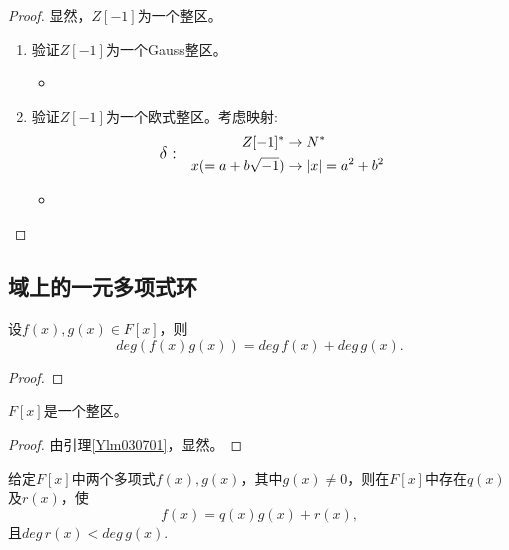 \begin{proof}
	显然，$Z[-1]$为一个整区。
	\begin{enumerate}
		\item 验证$Z[-1]$为一个Gauss整区。
		\begin{itemize}
			\item 
		\end{itemize}
		\item 验证$Z[-1]$为一个欧式整区。考虑映射:
		\begin{equation*}
		\text{\large $\delta:$}\quad
		\begin{aligned}
			Z[-1]^{*} &\rightarrow N^{*}\\
			x(=a+b\sqrt{-1}) &\rightarrow |x|=a^{2}+b^{2} 
		\end{aligned}
		\end{equation*}
		\begin{itemize}
			\item 
		\end{itemize}
	\end{enumerate}
	
		
\end{proof}

\subsection{域上的一元多项式环}
\begin{lemma}\label{Ylm030701}
	设$f(x),g(x)\in F[x]$，则
	\begin{equation*}
		deg(f(x)g(x))=deg \, f(x) +deg \, g(x).
	\end{equation*}
\end{lemma}

\begin{proof}
	
\end{proof}

\begin{corollary}
	$F[x]$是一个整区。
\end{corollary}

\begin{proof}
	由引理\ref{Ylm030701}，显然。
\end{proof}

\begin{lemma}\label{Ylm030702}
	给定$F[x]$中两个多项式$f(x),g(x)$，其中$g(x)\neq 0$，则在$F[x]$中存在$q(x)$及$r(x)$，使
	\begin{equation*}
			f(x)=q(x)g(x)+r(x),
	\end{equation*}
	且\hspace{\fill}$deg \, r(x)< deg \, g(x).$\hspace{\fill}{}
\end{lemma}

